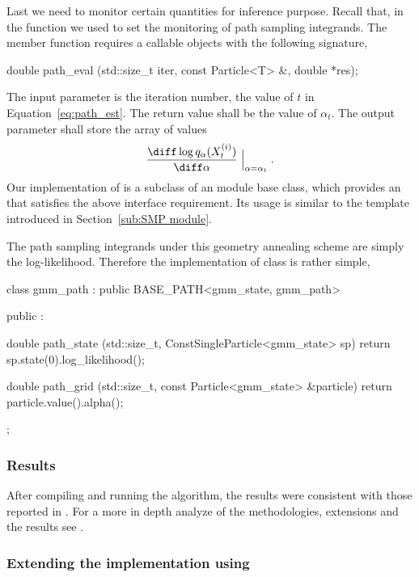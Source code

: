 \documentclass[11pt, fontset=Minion, showoverfull,
bib, biblatexstyle=numeric, mintcode, minted=cache]{marticle}
\begin{document}
Last we need to monitor certain quantities for inference purpose. Recall that,
in the  function we used
 to set the monitoring of path
sampling integrands. The  member function requires a
callable objects with the following signature,
\begin{cppcode}
double path_eval (std::size_t iter, const Particle<T> &, double *res);
\end{cppcode}
The input parameter  is the iteration number, the value of $t$
in Equation~\ref{eq:path_est}. The return value shall be the value of
$\alpha_t$.  The output parameter  shall store the array of
values
\begin{equation*}
  \rnd{\log q_{\alpha}(X_t^{(i)})}{\alpha}\Bigm|_{\alpha = \alpha_t}.
\end{equation*}
Our implementation of  is a subclass of an \smp module
base class, which provides an  that satisfies the above
interface requirement. Its usage is similar to the 
template introduced in Section~\ref{sub:SMP module}.

The path sampling integrands under this geometry annealing scheme are simply
the log-likelihood. Therefore the implementation of  class
is rather simple,
\begin{cppcode}
class gmm_path : public BASE_PATH<gmm_state, gmm_path>
{
    public :

    double path_state (std::size_t, ConstSingleParticle<gmm_state> sp)
    {return sp.state(0).log_likelihood();}

    double path_grid (std::size_t, const Particle<gmm_state> &particle)
    {return particle.value().alpha();}
};
\end{cppcode}

\subsubsection{Results}

After compiling and running the algorithm, the results were consistent with
those reported in \cite{DelMoral:2006hc}. For a more in depth analyze of the
methodologies, extensions and the results see \cite{Zhou2013mc}.

\subsubsection[Extending the implementation using MPI]{Extending the
  implementation using \mpi}
\end{document}
